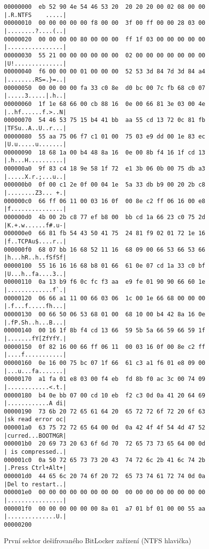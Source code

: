\begin{figure}[h]
		\centering
		\captionsetup{width=0.65\linewidth}
\begin{lstlisting}[frame=none, basicstyle=\ttfamily\small, columns=fullflexible, keepspaces=true]
00000000  eb 52 90 4e 54 46 53 20  20 20 20 00 02 08 00 00  |.R.NTFS    .....|
00000010  00 00 00 00 00 f8 00 00  3f 00 ff 00 00 28 03 00  |........?....(..|
00000020  00 00 00 00 80 00 00 00  ff 1f 03 00 00 00 00 00  |................|
00000030  55 21 00 00 00 00 00 00  02 00 00 00 00 00 00 00  |U!..............|
00000040  f6 00 00 00 01 00 00 00  52 53 3d 84 7d 3d 84 a4  |........RS=.}=..|
00000050  00 00 00 00 fa 33 c0 8e  d0 bc 00 7c fb 68 c0 07  |.....3.....|.h..|
00000060  1f 1e 68 66 00 cb 88 16  0e 00 66 81 3e 03 00 4e  |..hf......f.>..N|
00000070  54 46 53 75 15 b4 41 bb  aa 55 cd 13 72 0c 81 fb  |TFSu..A..U..r...|
00000080  55 aa 75 06 f7 c1 01 00  75 03 e9 dd 00 1e 83 ec  |U.u.....u.......|
00000090  18 68 1a 00 b4 48 8a 16  0e 00 8b f4 16 1f cd 13  |.h...H..........|
000000a0  9f 83 c4 18 9e 58 1f 72  e1 3b 06 0b 00 75 db a3  |.....X.r.;...u..|
000000b0  0f 00 c1 2e 0f 00 04 1e  5a 33 db b9 00 20 2b c8  |........Z3... +.|
000000c0  66 ff 06 11 00 03 16 0f  00 8e c2 ff 06 16 00 e8  |f...............|
000000d0  4b 00 2b c8 77 ef b8 00  bb cd 1a 66 23 c0 75 2d  |K.+.w......f#.u-|
000000e0  66 81 fb 54 43 50 41 75  24 81 f9 02 01 72 1e 16  |f..TCPAu$....r..|
000000f0  68 07 bb 16 68 52 11 16  68 09 00 66 53 66 53 66  |h...hR..h..fSfSf|
00000100  55 16 16 16 68 b8 01 66  61 0e 07 cd 1a 33 c0 bf  |U...h..fa....3..|
00000110  0a 13 b9 f6 0c fc f3 aa  e9 fe 01 90 90 66 60 1e  |.............f`.|
00000120  06 66 a1 11 00 66 03 06  1c 00 1e 66 68 00 00 00  |.f...f.....fh...|
00000130  00 66 50 06 53 68 01 00  68 10 00 b4 42 8a 16 0e  |.fP.Sh..h...B...|
00000140  00 16 1f 8b f4 cd 13 66  59 5b 5a 66 59 66 59 1f  |.......fY[ZfYfY.|
00000150  0f 82 16 00 66 ff 06 11  00 03 16 0f 00 8e c2 ff  |....f...........|
00000160  0e 16 00 75 bc 07 1f 66  61 c3 a1 f6 01 e8 09 00  |...u...fa.......|
00000170  a1 fa 01 e8 03 00 f4 eb  fd 8b f0 ac 3c 00 74 09  |............<.t.|
00000180  b4 0e bb 07 00 cd 10 eb  f2 c3 0d 0a 41 20 64 69  |............A di|
00000190  73 6b 20 72 65 61 64 20  65 72 72 6f 72 20 6f 63  |sk read error oc|
000001a0  63 75 72 72 65 64 00 0d  0a 42 4f 4f 54 4d 47 52  |curred...BOOTMGR|
000001b0  20 69 73 20 63 6f 6d 70  72 65 73 73 65 64 00 0d  | is compressed..|
000001c0  0a 50 72 65 73 73 20 43  74 72 6c 2b 41 6c 74 2b  |.Press Ctrl+Alt+|
000001d0  44 65 6c 20 74 6f 20 72  65 73 74 61 72 74 0d 0a  |Del to restart..|
000001e0  00 00 00 00 00 00 00 00  00 00 00 00 00 00 00 00  |................|
000001f0  00 00 00 00 00 00 8a 01  a7 01 bf 01 00 00 55 aa  |..............U.|
00000200
\end{lstlisting}
		\caption{První sektor dešifrovaného BitLocker zařízení (NTFS hlavička)}
		\label{fig:ntfs-header}
\end{figure}

